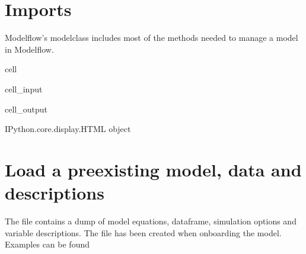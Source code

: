 \documentclass[letterpaper,10pt,english]{jupyterBook}
\begin{document}
\section{Imports}
\label{\detokenize{content/howto/experiments/Standard experiment simple:imports}}
\sphinxAtStartPar
Modelflow’s modelclass includes most of the methods needed to manage a model in Modelflow.

\begin{sphinxuseclass}{cell}\begin{sphinxVerbatimInput}

\begin{sphinxuseclass}{cell_input}
\begin{sphinxVerbatim}[commandchars=\\\{\}]
    
\end{sphinxVerbatim}

\end{sphinxuseclass}\end{sphinxVerbatimInput}
\begin{sphinxVerbatimOutput}

\begin{sphinxuseclass}{cell_output}
\begin{sphinxVerbatim}[commandchars=\\\{\}]
\PYGZlt{}IPython.core.display.HTML object\PYGZgt{}
\end{sphinxVerbatim}

\end{sphinxuseclass}\end{sphinxVerbatimOutput}

\end{sphinxuseclass}

\section{Load a pre\sphinxhyphen{}existing model, data and descriptions}
\label{\detokenize{content/howto/experiments/Standard experiment simple:load-a-pre-existing-model-data-and-descriptions}}
\sphinxAtStartPar
The file  contains a dump of model equations, dataframe, simulation options and variable descriptions. The file has been created when onboarding the model.
Examples can be found {\hyperref[\detokenize{content/howto/onboard/eviews/onboard one model from  wf1::doc}]{}}
\end{document}
